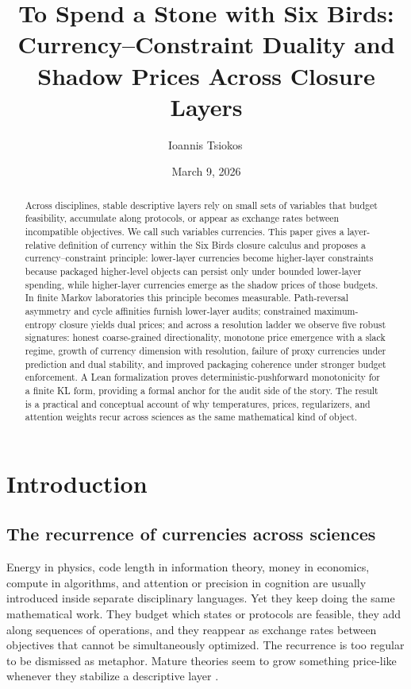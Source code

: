 \documentclass[11pt,a4paper]{article}
\title{To Spend a Stone with Six Birds: Currency--Constraint Duality and Shadow Prices Across Closure Layers}
\author{Ioannis Tsiokos\texorpdfstring{\,\orcidlink{0009-0009-7659-5964}}{}}
\date{March 9, 2026}
\begin{document}
\maketitle
\thispagestyle{firstpage}

\begin{abstract}
Across disciplines, stable descriptive layers rely on small sets of variables that budget feasibility, accumulate along protocols, or appear as exchange rates between incompatible objectives. We call such variables currencies. This paper gives a layer-relative definition of currency within the Six Birds closure calculus and proposes a currency--constraint principle: lower-layer currencies become higher-layer constraints because packaged higher-level objects can persist only under bounded lower-layer spending, while higher-layer currencies emerge as the shadow prices of those budgets. In finite Markov laboratories this principle becomes measurable. Path-reversal asymmetry and cycle affinities furnish lower-layer audits; constrained maximum-entropy closure yields dual prices; and across a resolution ladder we observe five robust signatures: honest coarse-grained directionality, monotone price emergence with a slack regime, growth of currency dimension with resolution, failure of proxy currencies under prediction and dual stability, and improved packaging coherence under stronger budget enforcement. A Lean formalization proves deterministic-pushforward monotonicity for a finite KL form, providing a formal anchor for the audit side of the story. The result is a practical and conceptual account of why temperatures, prices, regularizers, and attention weights recur across sciences as the same mathematical kind of object.
\end{abstract}
 \section{Introduction}

\subsection{The recurrence of currencies across sciences}

Energy in physics, code length in information theory, money in economics, compute in algorithms, and attention or precision in cognition are usually introduced inside separate disciplinary languages. Yet they keep doing the same mathematical work. They budget which states or protocols are feasible, they add along sequences of operations, and they reappear as exchange rates between objectives that cannot be simultaneously optimized. The recurrence is too regular to be dismissed as metaphor. Mature theories seem to grow something price-like whenever they stabilize a descriptive layer \cite{jaynes1957information,shannon1948mathematical,arrowdebreu1954,sims2003rationalinattention}.
\end{document}
